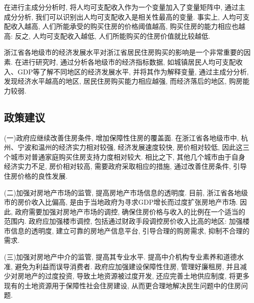 \documentclass[a4paper, 12pt, twoside]{ctexart}
\renewcommand\arraystretch{1}
\begin{document}
在进行主成分分析时, 将人均可支配收入作为一个变量加入了变量矩阵中, 通过主成分分析, 我们可以识别出人均可支配收入是相关性最高的变量. 事实上, 人均可支配收入越高, 人们所能承受的购买住房的价格阈值越高, 购买住房的能力相应也越高: 反之, 人均可支配收入越低, 人们所能购买的住房价值就比较越低.

浙江省各地级市的经济发展水平对浙江省居民住房购买的影响是一个非常重要的因素. 在进行研究时, 通过分析各地级市的经济指标数据, 如城镇居民人均可支配收入、GDP等了解不同地区的经济发展水平, 并将其作为解释变量, 通过主成分分析, 发现经济水平越高的地区, 居民住房购买能力相应越强, 而经济落后的地区, 购房能力较弱.

\subsection{政策建议}
(一)政府应继续改善住房条件, 增加保障性住房的覆盖面.  在浙江省各地级市中, 杭州、宁波和温州的经济实力相对较强, 经济发展速度较快, 房价相对较低, 因此这三个城市对普通家庭购买住房支持力度相对较大.  相比之下, 其他几个城市由于自身经济实力不足, 房价相对较高, 需要政府采取相应的措施, 通过改善住房条件, 引导住房价格的良性发展.

(二)加强对房地产市场的监管, 提高房地产市场信息的透明度.  目前, 浙江省各地级市的房价收入比偏高, 是由于当地政府为寻求GDP增长而过度扩张房地产市场.  因此, 政府需要加强对房地产市场的调控, 确保住房价格与收入的比例在一个适当的范围内.
政府应加强楼市调控, 包括通过财政手段调控房价收入比高的地区: 加强楼市信息的透明度, 建立可靠的房地产信息平台, 引导合理的购房需求, 抑制不合理的需求.

(三)加强对房地产中介的监管, 提高其专业水平. 提高中介机构专业素养和道德水准, 避免为利益而误导消费者. 政府应加强建设保障性住房, 管理好廉租房, 并且减少对房地产的过度投资, 导致土地资源被过度开发, 还应完善土地供应制度, 将更多现有的土地资源用于保障性社会住房建设, 从而更合理地解决民生问题中的住房问题.






%











\newpage
\end{document}
